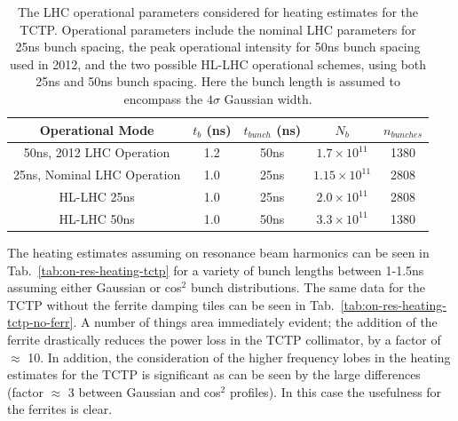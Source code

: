 \begin{table}
\caption{The LHC operational parameters considered for heating estimates for the TCTP. Operational parameters include the nominal LHC parameters for 25ns bunch spacing, the peak operational intensity for 50ns bunch spacing used in 2012, and the two possible HL-LHC operational schemes, using both 25ns and 50ns bunch spacing. Here the bunch length is assumed to encompass the $4\sigma$ Gaussian width.}
\label{tab:lhc-tctp-heating-para}
\begin{center}
\begin{tabular}{c | c | c | c | c }
Operational Mode & $t_{b}$ (ns) & $t_{bunch}$ (ns) & $N_{b}$ & $n_{bunches}$ \\ \hline
50ns, 2012 LHC Operation & 1.2 & 50ns & $1.7 \times 10^{11}$ & 1380 \\ \hline
25ns, Nominal LHC Operation & 1.0 & 25ns & $1.15 \times 10^{11}$ & 2808 \\ \hline
HL-LHC 25ns & 1.0 & 25ns & $2.0 \times 10^{11}$ & 2808 \\ \hline
HL-LHC 50ns & 1.0 & 50ns & $3.3 \times 10^{11}$ & 1380 \\ \hline
\end{tabular}
\end{center}
\end{table}

The heating estimates assuming on resonance beam harmonics can be seen in Tab.~\ref{tab:on-res-heating-tctp} for a variety of bunch lengths between 1-1.5ns assuming either Gaussian or cos$^{2}$ bunch distributions. The same data for the TCTP without the ferrite damping tiles can be seen in Tab.~\ref{tab:on-res-heating-tctp-no-ferr}. A number of things area immediately evident; the addition of the ferrite drastically reduces the power loss in the TCTP collimator, by a factor of $\approx$ 10. In addition, the consideration of the higher frequency lobes in the heating estimates for the TCTP is significant as can be seen by the large differences (factor $\approx$ 3 between Gaussian and cos$^{2}$ profiles). In this case the usefulness for the ferrites is clear.


